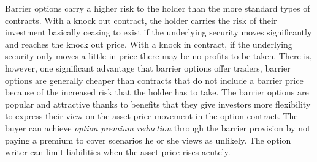 Barrier options carry a higher risk to the holder than the more standard types of contracts. With a knock out contract,  the holder carries the risk of their investment basically ceasing to exist if the underlying security moves significantly and reaches the knock out price. With a knock in contract, if the underlying security only moves a little in price there may be no profits to be taken. There is, however, one significant advantage that barrier options offer traders, barrier options are generally cheaper than contracts that do not include a barrier price  because of the increased risk that the holder has to take.  The barrier options are popular and attractive thanks to benefits that they give investors more flexibility to express their view on the asset price movement in the option contract. The buyer can achieve {\itshape option premium reduction} through the barrier provision by not paying a premium to cover scenarios he or she views as unlikely. The option writer can limit liabilities when the asset price rises acutely. 
